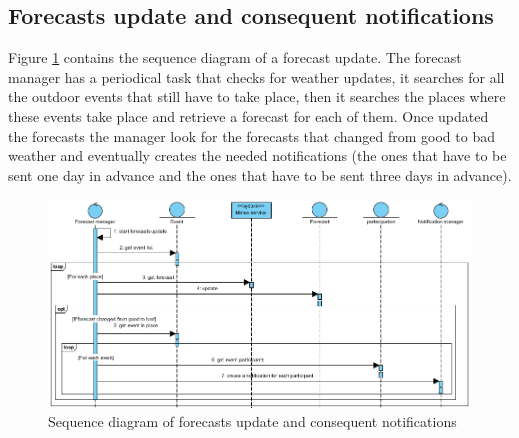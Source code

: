 \documentclass[10pt,a4paper,titlepage]{article}
\begin{document}
\subsection{Forecasts update and consequent notifications}
Figure \ref{fig:sequence_forecasts} contains the sequence diagram of a forecast update. The forecast manager has a periodical task that checks for weather updates, it searches for all the outdoor events that still have to take place, then it searches the places where these events take place and retrieve a forecast for each of them. Once updated the forecasts the manager look for the forecasts that changed from good to bad weather and eventually creates the needed notifications (the ones that have to be sent one day in advance and the ones that have to be sent three days in advance).
\begin{figure}[h!]
\centering
\includegraphics[width=\linewidth]{./images/sequence_forecast_update}
\caption[forecast update]{Sequence diagram of forecasts update and consequent notifications}
\label{fig:sequence_forecasts}
\end{figure}

\clearpage
\end{document}

